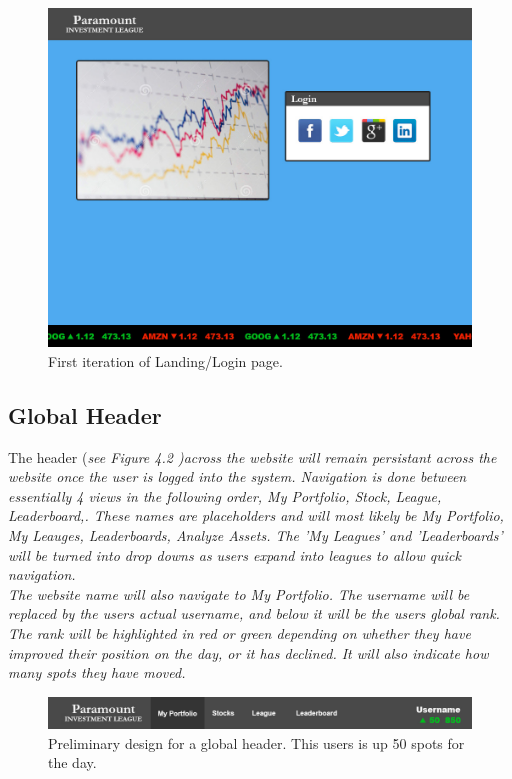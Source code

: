 \begin{figure}
\centering
\includegraphics[width=5.5in]{./img/mock/login.jpg}
\caption{First iteration of Landing/Login page.}
\end{figure}

\subsection{Global Header}

The header (\em see Figure 4.2 \em)across the website will remain persistant across the
website once the user is logged into the system.  Navigation is done between essentially
4 views in the following order, My Portfolio, Stock, League, Leaderboard,.  These names
are placeholders and will most likely be My Portfolio, My Leauges, Leaderboards,
Analyze Assets. The 'My Leagues' and 'Leaderboards' will be turned into drop downs as
users expand into leagues to allow quick navigation.\\

The website name will also navigate to My Portfolio. The username will be replaced by the
users actual username, and below it will be the users global rank.  The rank will be
highlighted in red or green depending on whether they have improved their position on the
day, or it has declined.  It will also indicate how many spots they have moved.\\

\begin{figure}
\centering
\includegraphics[width=5.5in]{./img/mock/topbar.jpg} %
\caption{Preliminary design for a global header. This users is up 50 spots for the day.}
\end{figure}

